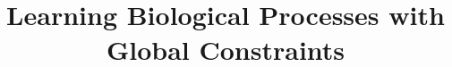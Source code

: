 \documentclass[11pt,letterpaper]{article}
\title{Learning Biological Processes with Global Constraints}
\begin{document}
\maketitle

 
 \label{sec:intro}
 \label{sec:process}
 \label{sec:model}
 \label{sec:experiment}
 \label{sec:related}
 \label{sec:conclusion}




\end{document}
